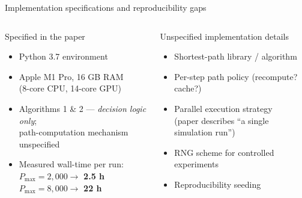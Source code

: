 \documentclass[aspectratio=169, xcolor=table]{beamer}
\newcommand{\source}[1]{\par\vspace{-0.15em}{\raggedleft\fontsize{5.4}{6.0}\selectfont\textcolor{gray}{#1}\par}}
\begin{document}
\begin{frame}[t]{Implementation specifications and reproducibility gaps}
\footnotesize

\begin{columns}[T,onlytextwidth]
\begin{block}{\small Specified in the paper}
\scriptsize
\begin{itemize}\itemsep0.25em
  \item Python 3.7 environment
  \item Apple M1 Pro, 16 GB RAM\\
        (8-core CPU, 14-core GPU)
  \item Algorithms 1 \& 2 --- \emph{decision logic only};\\
        path-computation mechanism unspecified
  \item Measured wall-time per run:\\
        $P_{\max} = 2{,}000 \to$ \textbf{2.5 h}\\
        $P_{\max} = 8{,}000 \to$ \textbf{22 h}
\end{itemize}
\end{block}

\begin{alertblock}{\small Unspecified implementation details}
\scriptsize
\begin{itemize}\itemsep0.25em
  \item Shortest-path library / algorithm
  \item Per-step path policy (recompute? cache?)
  \item Parallel execution strategy\\
        (paper describes ``a single simulation run'')
  \item RNG scheme for controlled experiments
  \item Reproducibility seeding
\end{itemize}
\end{alertblock}
\end{columns}

\vspace{0.6em}
\begin{center}
\end{center}

\source{Shi et al.\ (2024), p.\ 379}
\end{frame}
\end{document}
